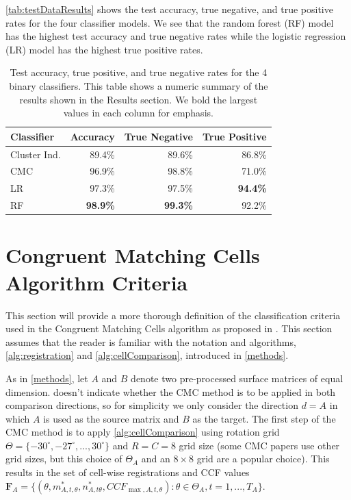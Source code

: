 \documentclass[reprint]{JASA}
\begin{document}
\begin{appendices}
\autoref{tab:testDataResults} shows the test accuracy, true negative, and true positive rates for the four classifier models.
We see that the random forest (RF) model has the highest test accuracy and true negative rates while the logistic regression (LR) model has the highest true positive rates.

\begin{table}[htbp]
    \centering
    \begin{tabular}{l|r|r|r}
         \textbf{Classifier} & \textbf{Accuracy} & \textbf{True Negative} & \textbf{True Positive} \\
         \hline
         Cluster Ind. & 89.4\% & 89.6\% & 86.8\% \\
         CMC & 96.9\% & 98.8\% & 71.0\% \\
         \hline
         LR & 97.3\% & 97.5\% & \textbf{94.4\%} \\
         RF & \textbf{98.9\%} & \textbf{99.3\%} & 92.2\%
    \end{tabular}
    \caption{Test accuracy, true positive, and true negative rates for the 4 binary classifiers. This table shows a numeric summary of the results shown in the Results section. We bold the largest values in each column for emphasis.}
    \label{tab:testDataResults}
\end{table}

\section{Congruent Matching Cells Algorithm Criteria} \label{appendixCMC}

This section will provide a more thorough definition of the classification criteria used in the Congruent Matching Cells algorithm as proposed in \citet{song_proposed_2013}.
This section assumes that the reader is familiar with the notation and algorithms, \autoref{alg:registration} and \autoref{alg:cellComparison}, introduced in \ref{methods}.

As in \ref{methods}, let $A$ and $B$ denote two pre-processed surface matrices of equal dimension.
\citet{song_proposed_2013} doesn't indicate whether the CMC method is to be applied in both comparison directions, so for simplicity we only consider the direction $d = A$ in which $A$ is used as the source matrix and $B$ as the target.
The first step of the CMC method is to apply \autoref{alg:cellComparison} using rotation grid $\Theta = \{-30^{\circ}, -27^{\circ},...,30^{\circ}\}$ and $R = C = 8$ grid size (some CMC papers use other grid sizes, but this choice of $\Theta_A$ and an $8 \times 8$ grid are a popular choice).
This results in the set of cell-wise registrations and CCF values $\pmb{F}_A = \{(\theta, m_{A,t,\theta}^*, n_{A,t\theta}^*, CCF_{\max,A,t,\theta}) : \theta \in \Theta_A, t = 1,...,T_A\}$.


\end{appendices}
\end{document}
